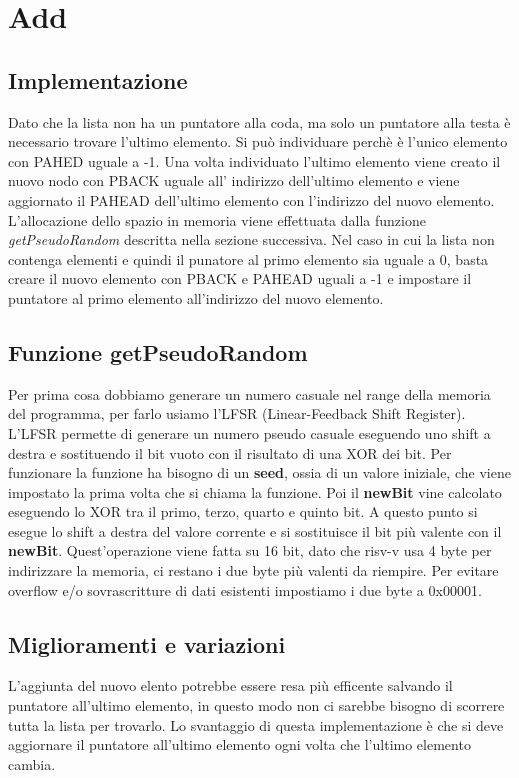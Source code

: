 \section{Add}
\subsection{Implementazione}
Dato che la lista non ha un puntatore alla coda, ma solo un puntatore alla testa è necessario
trovare l'ultimo elemento. Si può individuare perchè è l'unico elemento con PAHED uguale a -1.
Una volta individuato l'ultimo elemento viene creato il nuovo nodo con PBACK uguale all'
indirizzo dell'ultimo elemento e viene aggiornato il PAHEAD dell'ultimo elemento con 
l'indirizzo del nuovo elemento.
L'allocazione dello spazio in memoria viene effettuata dalla funzione 
\textit{getPseudoRandom} descritta nella sezione successiva.
Nel caso in cui la lista non contenga elementi e quindi il punatore al primo elemento sia
uguale a 0, basta creare il nuovo elemento con PBACK e PAHEAD uguali a -1 e impostare
il puntatore al primo elemento all'indirizzo del nuovo elemento.

\subsection{Funzione getPseudoRandom}
Per prima cosa dobbiamo generare un numero casuale nel range della memoria del programma,
per farlo usiamo l'LFSR (Linear-Feedback Shift Register). 
L'LFSR permette di generare un numero pseudo casuale eseguendo uno shift a destra e sostituendo il bit vuoto 
con il risultato di una XOR dei bit.
Per funzionare la funzione ha bisogno di un \textbf{seed}, ossia di un valore iniziale, che viene 
impostato la prima volta che si chiama la funzione.
 Poi il \textbf{newBit} vine calcolato eseguendo lo XOR tra il primo,
terzo, quarto e quinto bit. A questo punto si esegue lo shift a destra del valore corrente e si sostituisce il bit 
più valente con il \textbf{newBit}. Quest'operazione viene fatta su 16 bit, dato che risv-v usa 4 byte per indirizzare la memoria,
 ci restano i due byte più valenti da riempire. Per evitare overflow e/o sovrascritture di dati esistenti
impostiamo i due byte a 0x00001.

\subsection{Miglioramenti e variazioni}
L'aggiunta del nuovo elento potrebbe essere resa più efficente salvando il puntatore 
all'ultimo elemento, in questo modo non ci sarebbe bisogno di scorrere tutta la lista
per trovarlo. Lo svantaggio di questa implementazione è che si deve aggiornare il 
puntatore all'ultimo elemento ogni volta che l'ultimo elemento cambia. 